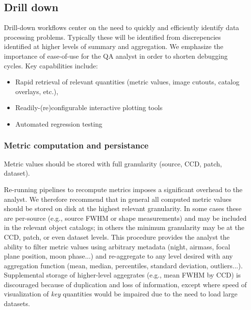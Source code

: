 
\subsection{Drill down} \label{sec:drill-down-design}


Drill-down workflows center on the need to quickly and efficiently identify data processing problems.
Typically these will be identified from discrepencies identified at higher levels of summary and aggregation.
We emphasize the importance of ease-of-use for the QA analyst in order to shorten debugging cycles. 
Key capabilities include:

\begin{itemize}
	\item Rapid retrieval of relevant quantities (metric values, image cutouts, catalog overlays, etc.), 
	\item Readily-(re)configurable interactive plotting tools 
	\item Automated regression testing
\end{itemize}

\subsubsection{Metric computation and persistance} \label{sec:metric_storage}

\begin{recommendation}
Metric values should be stored with full granularity (source, CCD, patch, dataset).
\end{recommendation}

Re-running pipelines to recompute metrics imposes a significant overhead to the analyst.
We therefore recommend that in general all computed metric values should be stored on disk at the highest relevant granularity.
In some cases these are per-source (e.g., source FWHM or shape measurements) and may be included in the relevant object catalogs; in others the minimum granularity may be at the CCD, patch, or even dataset levels.
This procedure provides the analyst the ability to filter metric values using arbitrary metadata (night, airmass, focal plane position, moon phase...) and re-aggregate to any level desired with any aggregation function (mean, median, percentiles, standard deviation, outliers...).
Supplemental storage of higher-level aggegrates (e.g., mean FWHM by CCD) is discouraged because of duplication and loss of information, except where speed of visualization of \emph{key} quantities would be impaired due to the need to load large datasets.



